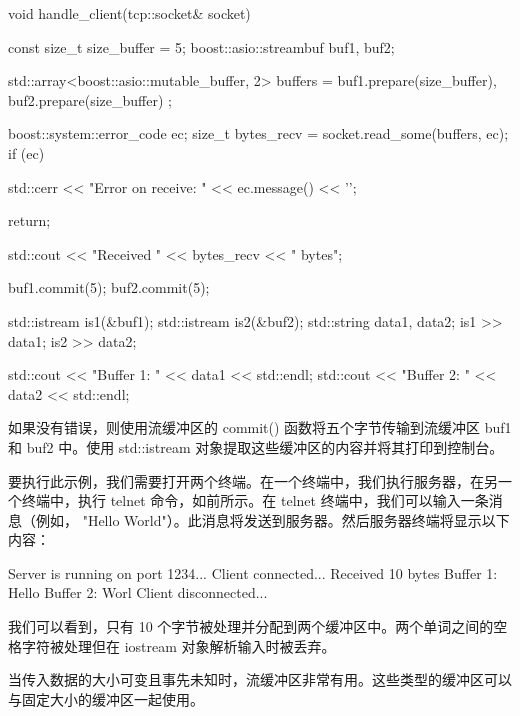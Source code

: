 \begin{cpp}
void handle_client(tcp::socket& socket) {
    const size_t size_buffer = 5;
    boost::asio::streambuf buf1, buf2;

    std::array<boost::asio::mutable_buffer, 2> buffers = {
        buf1.prepare(size_buffer),
        buf2.prepare(size_buffer)
    };

    boost::system::error_code ec;
    size_t bytes_recv = socket.read_some(buffers, ec);
    if (ec) {
        std::cerr << "Error on receive: "
                  << ec.message() << '\n';

        return;
    }

    std::cout << "Received " << bytes_recv << " bytes\n";

    buf1.commit(5);
    buf2.commit(5);

    std::istream is1(&buf1);
    std::istream is2(&buf2);
    std::string data1, data2;
    is1 >> data1;
    is2 >> data2;

    std::cout << "Buffer 1: " << data1 << std::endl;
    std::cout << "Buffer 2: " << data2 << std::endl;
}
\end{cpp}

如果没有错误，则使用流缓冲区的 commit() 函数将五个字节传输到流缓冲区 buf1 和 buf2 中。使用 std::istream 对象提取这些缓冲区的内容并将其打印到控制台。

要执行此示例，我们需要打开两个终端。在一个终端中，我们执行服务器，在另一个终端中，执行 telnet 命令，如前所示。在 telnet 终端中，我们可以输入一条消息（例如， "Hello World"）。此消息将发送到服务器。然后服务器终端将显示以下内容：

\begin{shell}
Server is running on port 1234...
Client connected...
Received 10 bytes
Buffer 1: Hello
Buffer 2: Worl
Client disconnected...
\end{shell}

我们可以看到，只有 10 个字节被处理并分配到两个缓冲区中。两个单词之间的空格字符被处理但在 iostream 对象解析输入时被丢弃。

当传入数据的大小可变且事先未知时，流缓冲区非常有用。这些类型的缓冲区可以与固定大小的缓冲区一起使用。




























